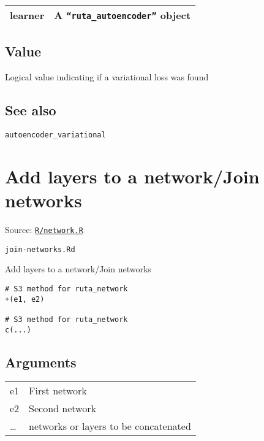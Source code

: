 \begin{longtable}[c]{@{}>{\small}p{3cm}>{\raggedright}p{12.5cm}@{}}
\toprule
learner & A \texttt{``ruta\_autoencoder''} object\tabularnewline
\bottomrule
\end{longtable}

\hypertarget{value}{\subsection{\texorpdfstring{\protect\hyperlink{value}{}Value}{Value}}\label{value}}

Logical value indicating if a variational loss was found

\hypertarget{see-also}{\subsection{\texorpdfstring{\protect\hyperlink{see-also}{}See
also}{See also}}\label{see-also}}

\texttt{autoencoder\_variational}

\section{Add layers to a network/Join
networks}\label{add-layers-to-a-networkjoin-networks}

Source:
\href{https://github.com/fdavidcl/ruta/blob/master/R/network.R}{\texttt{R/network.R}}

\texttt{join-networks.Rd}

Add layers to a network/Join networks

\begin{verbatim}
# S3 method for ruta_network
+(e1, e2)

# S3 method for ruta_network
c(...)
\end{verbatim}

\hypertarget{arguments}{\subsection{\texorpdfstring{\protect\hyperlink{arguments}{}Arguments}{Arguments}}\label{arguments}}

\begin{longtable}[c]{@{}>{\small}p{3cm}>{\raggedright}p{12.5cm}@{}}
\toprule
e1 & First network\tabularnewline
e2 & Second network\tabularnewline
\ldots{} & networks or layers to be concatenated\tabularnewline
\bottomrule
\end{longtable}

